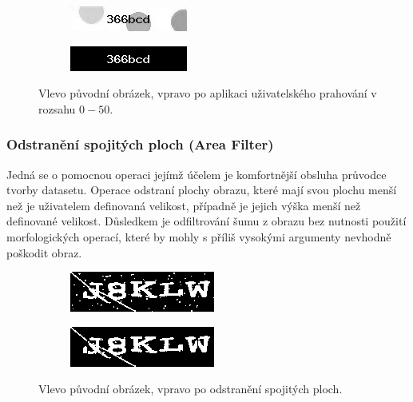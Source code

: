 \documentclass[
  field=ainfp,
  master=true,
  biblatex,
  sourcecodes=false,
  theorems=false,
  glossaries,
  index
]{kidiplom}
\begin{document}
\begin{figure}[H]
\centering
\begin{subfigure}{.5\textwidth}
  \centering
  \includegraphics[width=.8\linewidth]{images/custom_original.png}
\end{subfigure}%
\begin{subfigure}{.5\textwidth}
  \centering
  \includegraphics[width=.8\linewidth]{images/custom_result_0_50.png}
\end{subfigure}
\caption{Vlevo původní obrázek, vpravo po aplikaci uživatelského prahování v rozsahu $0 - 50$.}
\label{fig:inverse_example}
\end{figure}

\subsubsection*{Odstranění spojitých ploch (Area Filter)}
Jedná se o pomocnou operaci jejímž účelem je komfortnější obsluha průvodce tvorby datasetu. Operace odstraní plochy obrazu, které mají svou plochu menší než je uživatelem definovaná velikost, případně je jejich výška menší než definované velikost. Důsledkem je odfiltrování šumu z obrazu bez nutnosti použití morfologických operací, které by mohly s příliš vysokými argumenty nevhodně poškodit obraz.
\begin{figure}[H]
\centering
\begin{subfigure}{.5\textwidth}
  \centering
  \includegraphics[width=.8\linewidth]{images/filter_original.png}
\end{subfigure}%
\begin{subfigure}{.5\textwidth}
  \centering
  \includegraphics[width=.8\linewidth]{images/filter_result.png}
\end{subfigure}
\caption{Vlevo původní obrázek, vpravo po odstranění spojitých ploch.}
\label{fig:inverse_example}
\end{figure}
\end{document}
